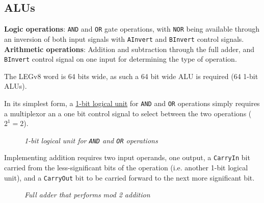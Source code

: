 \documentclass[11pt]{article}
\begin{document}
\subsection*{ALUs}

\begin{tcolorbox}[
    enhanced,
    attach boxed title to top left={xshift=6mm,yshift=-1.5mm},
    colback=moonstoneblue!20,
    colframe=moonstoneblue,
    colbacktitle=moonstoneblue,
    title=Operation done by the ALU,
    fonttitle=\bfseries\color{white},
    boxed title style={size=small,colframe=moonstoneblue,sharp corners},
    sharp corners,
]
    {\color{moondark}\textbf{Logic operations}}: \texttt{AND} and \texttt{OR} gate operations, with \texttt{NOR} being available through an inversion of both input signals with \texttt{AInvert} and \texttt{BInvert} control signals. \\
    {\color{moondark}\textbf{Arithmetic operations}}: Addition and subtraction through the full adder, and \texttt{BInvert} control signal on one input for determining the type of operation.
\end{tcolorbox}

The LEGv8 word is 64 bits wide, as such a 64 bit wide ALU is required (64 1-bit ALUs).

In its simplest form, a \underline{1-bit logical unit} for \texttt{AND} and \texttt{OR} operations simply requires a multiplexor an a one bit control signal to select between the two operations ($2^1=2$).

\begin{figure}[htbp]
    \centering
    \caption{\textit{1-bit logical unit for \texttt{AND} and \texttt{OR} operations}}
\end{figure}

Implementing addition requires two input operands, one output, a \texttt{CarryIn} bit carried from the less-significant bits of the operation (i.e. another 1-bit logical unit), and a \texttt{CarryOut} bit to be carried forward to the next more significant bit.

\begin{figure}[htbp]
    \centering
    \caption{\textit{Full adder that performs mod 2 addition}}
\end{figure}
\end{document}
